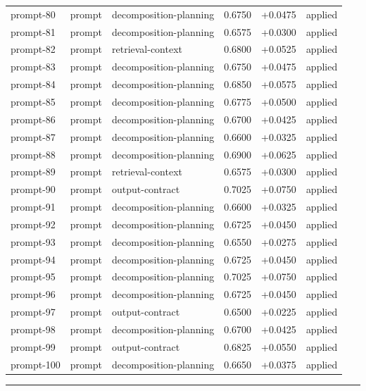 \begin{center}
\begin{longtable}{llp{5.2cm}rrl}
prompt-80 & prompt & decomposition-planning & 0.6750 & +0.0475 & applied \\
prompt-81 & prompt & decomposition-planning & 0.6575 & +0.0300 & applied \\
prompt-82 & prompt & retrieval-context & 0.6800 & +0.0525 & applied \\
prompt-83 & prompt & decomposition-planning & 0.6750 & +0.0475 & applied \\
prompt-84 & prompt & decomposition-planning & 0.6850 & +0.0575 & applied \\
prompt-85 & prompt & decomposition-planning & 0.6775 & +0.0500 & applied \\
prompt-86 & prompt & decomposition-planning & 0.6700 & +0.0425 & applied \\
prompt-87 & prompt & decomposition-planning & 0.6600 & +0.0325 & applied \\
prompt-88 & prompt & decomposition-planning & 0.6900 & +0.0625 & applied \\
prompt-89 & prompt & retrieval-context & 0.6575 & +0.0300 & applied \\
prompt-90 & prompt & output-contract & 0.7025 & +0.0750 & applied \\
prompt-91 & prompt & decomposition-planning & 0.6600 & +0.0325 & applied \\
prompt-92 & prompt & decomposition-planning & 0.6725 & +0.0450 & applied \\
prompt-93 & prompt & decomposition-planning & 0.6550 & +0.0275 & applied \\
prompt-94 & prompt & decomposition-planning & 0.6725 & +0.0450 & applied \\
prompt-95 & prompt & decomposition-planning & 0.7025 & +0.0750 & applied \\
prompt-96 & prompt & decomposition-planning & 0.6725 & +0.0450 & applied \\
prompt-97 & prompt & output-contract & 0.6500 & +0.0225 & applied \\
prompt-98 & prompt & decomposition-planning & 0.6700 & +0.0425 & applied \\
prompt-99 & prompt & output-contract & 0.6825 & +0.0550 & applied \\
prompt-100 & prompt & decomposition-planning & 0.6650 & +0.0375 & applied \\
\bottomrule\end{longtable}\end{center}
\par\bigskip\hrule\bigskip
